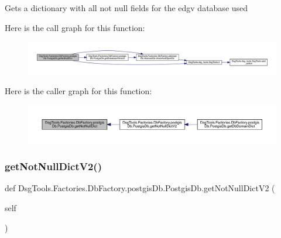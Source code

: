 \begin{DoxyVerb}Gets a dictionary with all not null fields for the edgv database used
\end{DoxyVerb}
 Here is the call graph for this function\+:
\nopagebreak
\begin{figure}[H]
\begin{center}
\leavevmode
\includegraphics[width=350pt]{class_dsg_tools_1_1_factories_1_1_db_factory_1_1postgis_db_1_1_postgis_db_abaf725509d5d11eec8da36fbaf99e2ac_cgraph}
\end{center}
\end{figure}
Here is the caller graph for this function\+:
\nopagebreak
\begin{figure}[H]
\begin{center}
\leavevmode
\includegraphics[width=350pt]{class_dsg_tools_1_1_factories_1_1_db_factory_1_1postgis_db_1_1_postgis_db_abaf725509d5d11eec8da36fbaf99e2ac_icgraph}
\end{center}
\end{figure}
\mbox{\label{class_dsg_tools_1_1_factories_1_1_db_factory_1_1postgis_db_1_1_postgis_db_aea8a82ce913538818084cc59189c6a1a}} 
\subsubsection{\texorpdfstring{get\+Not\+Null\+Dict\+V2()}{getNotNullDictV2()}}
{\footnotesize\ttfamily def Dsg\+Tools.\+Factories.\+Db\+Factory.\+postgis\+Db.\+Postgis\+Db.\+get\+Not\+Null\+Dict\+V2 (\begin{DoxyParamCaption}\item[{}]{self }\end{DoxyParamCaption})}

